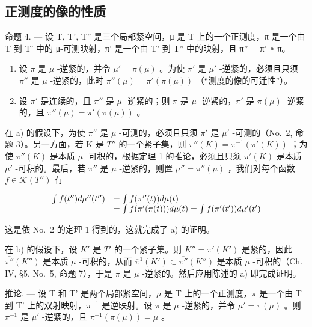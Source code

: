 \subsection{正测度的像的性质}

命题 4. --- 设 T, T', T'' 是三个局部紧空间，μ 是 T 上的一个正测度，π 是一个由 T 到 T' 中的 μ-可测映射，π' 是一个由 T' 到 T'' 中的映射，且 π'' = π' ∘ π。

\begin{enumerate}
\def\labelenumi{\alph{enumi})}
\item
  设 \(\pi\) 是 \(\mu\) -逆紧的，并令 \(\mu' = \pi(\mu)\) 。为使 \(\pi'\) 是 \(\mu'\) -逆紧的，必须且只须 \(\pi''\) 是 \(\mu\) -逆紧的，此时 \(\pi''(\mu) = \pi'(\pi(\mu))\) （“测度的像的可迁性”）。
\item
  设 \(\pi'\) 是连续的，且 \(\pi''\) 是 \(\mu\) -逆紧的；则 \(\pi\) 是 \(\mu\) -逆紧的，\(\pi'\) 是 \(\pi(\mu)\) -逆紧的，且 \(\pi''(\mu) = \pi'(\pi(\mu))\) 。
\end{enumerate}

在 a) 的假设下，为使 \(\pi''\) 是 \(\mu\) -可测的，必须且只须 \(\pi'\) 是 \(\mu'\) -可测的（No.~2, 命题 3）。另一方面，若 K 是 \(T''\) 的一个紧子集，则 \(\pi''(K) = \pi^{-1}(\pi'(K))\) ；为使 \(\pi''(K)\) 是本质 \(\mu\) -可积的，根据定理 1 的推论，必须且只须 \(\pi'(K)\) 是本质 \(\mu'\) -可积的。最后，若 \(\pi''\) 是 \(\mu\) -逆紧的，则置 \(\mu'' = \pi''(\mu)\) ，我们对每个函数 \(f \in \mathcal{K}(T'')\) 有

\[
\begin{array}{r l} \int f (t ^ {\prime \prime}) d \mu^ {\prime \prime} (t ^ {\prime \prime}) & = \int f (\pi^ {\prime \prime} (t)) d \mu (t) \\ & = \int f (\pi^ {\prime} (\pi (t))) d \mu (t) = \int f (\pi^ {\prime} (t ^ {\prime})) d \mu^ {\prime} (t ^ {\prime}) \end{array}
\]

这是依 No.~2 的定理 1 得到的，这就完成了 a) 的证明。

在 b) 的假设下，设 \(K'\) 是 \(T'\) 的一个紧子集。则 \(K'' = \pi'(K')\) 是紧的，因此 \(\overline{\pi''}(K'')\) 是本质 \(\mu\) -可积的，从而 \(\overline{\pi}^{1}(K') \subset \overline{\pi''}(K'')\) 是本质 \(\mu\) -可积的（Ch. IV, §5, No.~5, 命题 7），于是 \(\pi\) 是 \(\mu\) -逆紧的。然后应用陈述的 a) 即完成证明。

推论. --- 设 T 和 T' 是两个局部紧空间，\(\mu\) 是 T 上的一个正测度，\(\pi\) 是一个由 T 到 T' 上的双射映射，\(\pi^{-1}\) 是逆映射。设 \(\pi\) 是 \(\mu\) -逆紧的，并令 \(\mu' = \pi(\mu)\) 。则 \(\pi^{-1}\) 是 \(\mu'\) -逆紧的，且 \(\pi^{-1}(\pi(\mu)) = \mu\) 。

